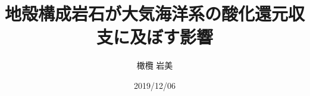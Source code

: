 \documentclass[a4paper,uplatex,dvipdfmx]{jsarticle}
\title{地殻構成岩石が大気海洋系の酸化還元収支に及ぼす影響}
\author{橄欖 岩美}
\date{2019/12/06}
\begin{document}
\begin{titlepage}
\epmaketitle
\thispagestyle{empty}
\end{titlepage}
\end{document}
